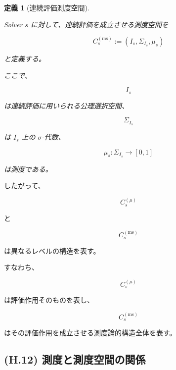 \documentclass[a4paper,11pt]{article}
\newtheorem{definition}{定義}[section]
\begin{document}
\begin{definition}[連続評価測度空間]
\label{def:H-continuous-measure-space}

Solver $s$ に対して、連続評価を成立させる測度空間を

\begin{equation}
    \boxed{
        C_s^{(\mathrm{ms})}
        :=
        (I_s,\Sigma_{I_s},\mu_s)
    }
    \label{eq:H-Cs-measure-space}
\end{equation}

と定義する。

ここで、

\begin{equation}
    I_s
\end{equation}

は連続評価に用いられる公理選択空間、

\begin{equation}
    \Sigma_{I_s}
\end{equation}

は $I_s$ 上の $\sigma$-代数、

\begin{equation}
    \mu_s:
    \Sigma_{I_s}
    \longrightarrow
    [0,1]
\end{equation}

は測度である。
\end{definition}

したがって、

\begin{equation}
    C_s^{(\mu)}
\end{equation}

と

\begin{equation}
    C_s^{(\mathrm{ms})}
\end{equation}

は異なるレベルの構造を表す。

すなわち、

\begin{equation}
    C_s^{(\mu)}
\end{equation}

は評価作用そのものを表し、

\begin{equation}
    C_s^{(\mathrm{ms})}
\end{equation}

はその評価作用を成立させる測度論的構造全体を表す。


\subsection{(H.12) 測度と測度空間の関係}
\label{subsec:H12}
\end{document}
